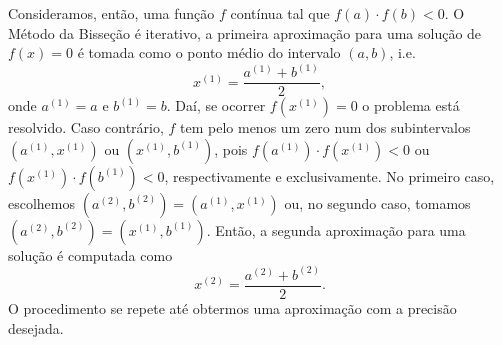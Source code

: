 Consideramos, então, uma função $f$ contínua tal que $f(a)\cdot f(b) < 0$. O Método da Bisseção é iterativo, a primeira aproximação para uma solução de $f(x)=0$ é tomada como o ponto médio do intervalo $(a, b)$, i.e.
\begin{equation}
  x^{(1)} = \frac{a^{(1)}+b^{(1)}}{2},
\end{equation}
onde $a^{(1)} = a$ e $b^{(1)} = b$. Daí, se ocorrer $f(x^{(1)})=0$ o problema está resolvido. Caso contrário, $f$ tem pelo menos um zero num dos subintervalos $(a^{(1)}, x^{(1)})$ ou $(x^{(1)}, b^{(1)})$, pois $f(a^{(1)})\cdot f(x^{(1)}) < 0$ ou  $f(x^{(1)})\cdot f(b^{(1)}) < 0$, respectivamente e exclusivamente. No primeiro caso, escolhemos $(a^{(2)}, b^{(2)}) = (a^{(1)}, x^{(1)})$ ou, no segundo caso, tomamos $(a^{(2)}, b^{(2)}) = (x^{(1)}, b^{(1)})$. Então, a segunda aproximação para uma solução é computada como
\begin{equation}
  x^{(2)} = \frac{a^{(2)} + b^{(2)}}{2}.
\end{equation}
O procedimento se repete até obtermos uma aproximação com a precisão desejada.

